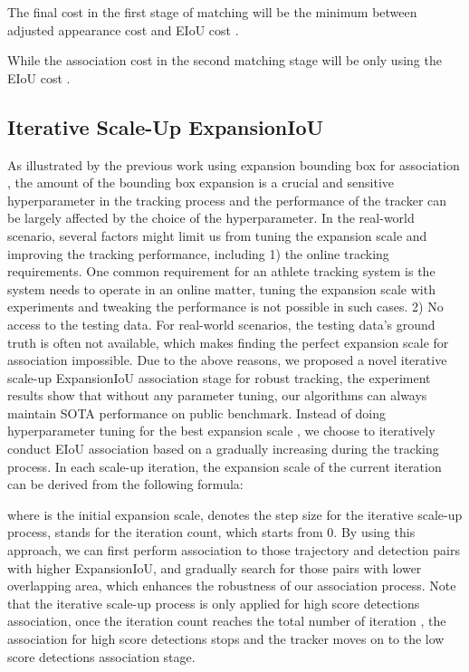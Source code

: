 \documentclass[10pt,twocolumn,letterpaper]{article}
\begin{document}
The final cost in the first stage of matching  will be the minimum between adjusted appearance cost  and EIoU cost . 



While the association cost in the second matching stage  will be only using the EIoU cost .


\subsection{Iterative Scale-Up ExpansionIoU}\label{sec:iterative}
As illustrated by the previous work using expansion bounding box for association \cite{yang2023hard}, the amount of the bounding box expansion is a crucial and sensitive hyperparameter in the tracking process and the performance of the tracker can be largely affected by the choice of the hyperparameter. In the real-world scenario, several factors might limit us from tuning the expansion scale and improving the tracking performance, including 1) the online tracking requirements. One common requirement for an athlete tracking system is the system needs to operate in an online matter, tuning the expansion scale with experiments and tweaking the performance is not possible in such cases. 2) No access to the testing data. For real-world scenarios, the testing data's ground truth is often not available, which makes finding the perfect expansion scale for association impossible. Due to the above reasons, we proposed a novel iterative scale-up ExpansionIoU association stage for robust tracking, the experiment results show that without any parameter tuning, our algorithms can always maintain SOTA performance on public benchmark.
Instead of doing hyperparameter tuning for the best expansion scale , we choose to iteratively conduct EIoU association based on a gradually increasing  during the tracking process. In each scale-up iteration, the expansion scale of the current iteration  can be derived from the following formula:


\noindent where  is the initial expansion scale,  denotes the step size for the iterative scale-up process,  stands for the iteration count, which starts from 0. By using this approach, we can first perform association to those trajectory and detection pairs with higher ExpansionIoU, and gradually search for those pairs with lower overlapping area, which enhances the robustness of our association process. Note that the iterative scale-up process is only applied for high score detections association, once the iteration count reaches the total number of iteration , the association for high score detections stops and the tracker moves on to the low score detections association stage.
\end{document}
